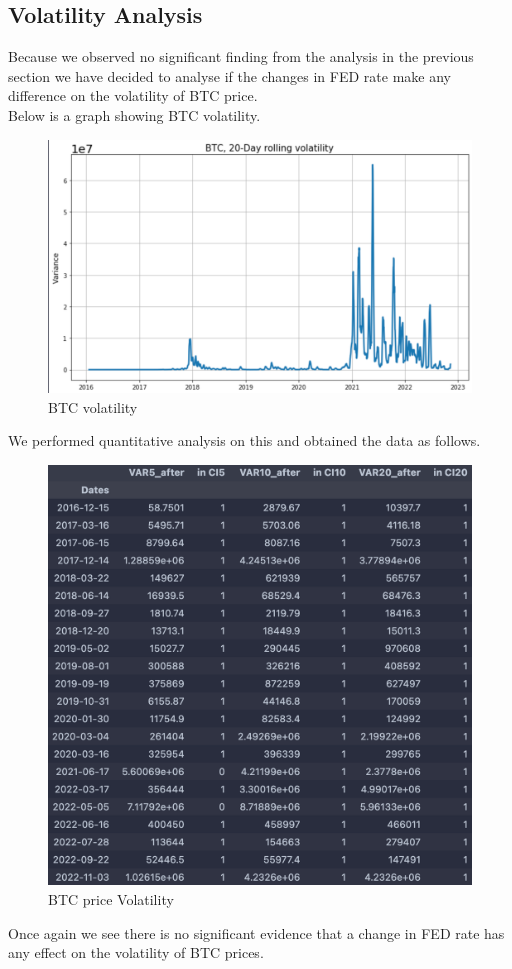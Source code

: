 \documentclass[12pt]{article}
\begin{document}
\subsection{Volatility Analysis}
Because we observed no significant finding from the analysis in the previous section we have decided to analyse if the changes in FED rate make any difference on the volatility of BTC price.\\
Below is a graph showing BTC volatility.
\begin{figure}[H]
   \includegraphics[scale=0.7]{research_project/text/paper/6.png}
   \centering
   \caption{BTC volatility}
   \label{fig:FED Rate evolution 2016 - 2022}
\end{figure}

\noindent We performed quantitative analysis on this and obtained the data as follows.

\begin{figure}[H]
   \includegraphics[scale=0.7]{research_project/text/paper/7.png}
   \centering
   \caption{BTC price Volatility}
   \label{fig:FED Rate evolution 2016 - 2022}
\end{figure}
Once again we see there is no significant evidence that a change in FED rate has any effect on the volatility of BTC prices.
\end{document}
